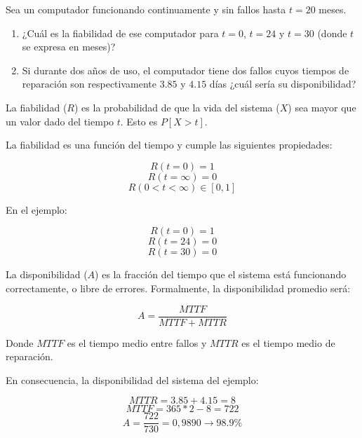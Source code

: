 \begin{acexercise}\end{acexercise}

Sea un computador funcionando continuamente y sin fallos hasta $t=20$ meses.

\begin{enumerate}

\item ¿Cuál es la fiabilidad de ese computador para $t=0$, $t=24$ y $t=30$ (donde $t$ se expresa en meses)?

\item Si durante dos años de uso, el computador tiene dos fallos cuyos tiempos de reparación son 
      respectivamente $3.85$ y $4.15$ días ¿cuál sería su disponibilidad?

\end{enumerate}

\begin{acsolution}\end{acsolution}

La fiabilidad ($R$) es la probabilidad de que la vida del sistema ($X$) 
sea mayor que un valor dado del tiempo $t$. Esto es $P[X>t]$.

La fiabilidad es una función del tiempo y cumple las siguientes propiedades:

\[ R(t=0)=1 \]
\[ R(t=\infty)=0 \]
\[ R(0<t<\infty) \in [0,1] \]

En el ejemplo:

\[R(t=0)=1\] 
\[R(t=24)=0\] 
\[R(t=30)=0\]

La disponibilidad ($A$) es la fracción del tiempo que el sistema está funcionando correctamente,
o libre de errores.
Formalmente, la disponibilidad promedio será:

\[
A=\frac{MTTF}{MTTF+MTTR}
\]

Donde $MTTF$ es el tiempo medio entre fallos y $MTTR$ es el tiempo medio de reparación.

En consecuencia, la disponibilidad del sistema del ejemplo:

\[ MTTR=3.85+4.15=8 \]
\[ MTTF=365*2-8=722 \]
\[ A=\frac{722}{730}= 0,9890 \rightarrow 98.9\% \]
